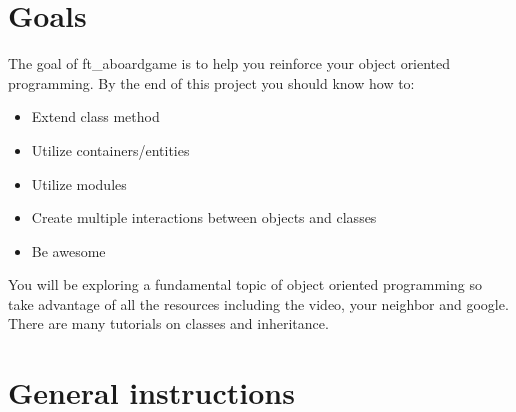 \documentclass{42-en}
\begin{document}
\chapter{Goals}

	The goal of ft\_aboardgame is to help you reinforce your object oriented programming.
	By the end of this project you should know how to:\\
	
	\begin{itemize}
		\item Extend class method
		\item Utilize containers/entities
		\item Utilize modules
		\item Create multiple interactions between objects and classes
		\item Be awesome\\
	\end{itemize}
	 
	You will be exploring a fundamental topic of object oriented programming
	so take advantage of all the resources including the video, your neighbor
	and google. There are many tutorials on classes and inheritance.


\chapter{General instructions}
\end{document}
